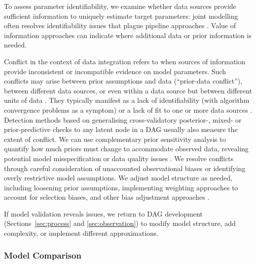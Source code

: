 \documentclass{article}
\begin{document}
To assess parameter identifiability, we examine whether data sources provide sufficient information to uniquely estimate target parameters: joint modelling often resolves identifiability issues that plague pipeline approaches \citep{lison2024generative, russell2024combined}. Value of information approaches \citep{jackson2019value,heath2024value} can indicate where additional data or prior information is needed.  

Conflict in the context of data integration refers to when sources of information provide inconsistent or incompatible evidence on model parameters. Such conflicts may arise between prior assumptions and data (``prior-data conflict''), between different data sources, or even within a data source but between different units of data \citep{presanis2013conflict,yang2025detecting}.
They typically manifest as a lack of identifiability (with algorithm convergence problems as a symptom) or a lack of fit to one or more data sources \citep{presanis2013conflict,deangelis2018analysing}. Detection methods based on generalising cross-validatory posterior-, mixed- or prior-predictive checks to any latent node in a DAG \citep{presanis2013conflict,yang2025detecting} usually also measure the extent of conflict. We can use complementary prior sensitivity analysis to quantify how much priors must change to accommodate observed data, revealing potential model misspecification or data quality issues \citep{Roos2015, Kallioinen2024, yang2025detecting}. We resolve conflicts through careful consideration of unaccounted observational biases or identifying overly restrictive model assumptions. We adjust model structure as needed, including loosening prior assumptions, implementing weighting approaches to account for selection biases, and other bias adjustment approaches \citep{deangelis2018analysing}.

If model validation reveals issues, we return to \ac{DAG} development (Sections~\ref{sec:process} and \ref{sec:observation}) to modify model structure, add complexity, or implement different approximations.

\subsubsection{Model Comparison}
\end{document}

